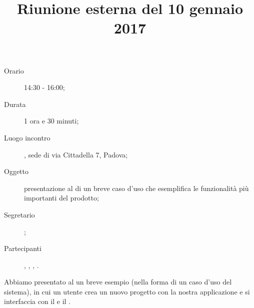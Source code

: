 


\author{\GG}
\supervisor{\MM}
\title{Riunione esterna del 10 gennaio 2017}



\maketitle

\begin{description}
	\item[Orario] 14:30 - 16:00;
	\item[Durata] 1 ora e 30 minuti;
	\item[Luogo incontro] \ZU, sede di via Cittadella 7, Padova;
	\item[Oggetto] presentazione al \GP di un breve caso d'uso che esemplifica le funzionalità più importanti del prodotto;
	\item[Segretario] \MM; 
	\item[Partecipanti] \GP, \LB, \GG, \MM.
\end{description}

Abbiamo presentato al \GP un breve esempio (nella forma di un caso d'uso del sistema), in cui un utente crea un nuovo progetto con la nostra applicazione e si interfaccia con il  e il .


